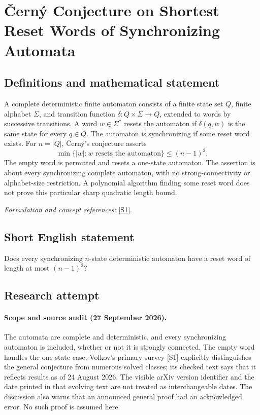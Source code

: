 \documentclass[11pt]{article}
\begin{document}
\section*{\texorpdfstring{Černý Conjecture on Shortest Reset Words of Synchronizing Automata}{Černý Conjecture on Shortest Reset Words of Synchronizing Automata}}\label{30006893}
\subsection{Definitions and mathematical statement}
A complete deterministic finite automaton consists of a finite state set $Q$, finite alphabet $\Sigma$, and transition function $\delta:Q\times\Sigma\to Q$, extended to words by successive transitions. A word $w\in\Sigma^*$ resets the automaton if $\delta(q,w)$ is the same state for every $q\in Q$. The automaton is synchronizing if some reset word exists. For $n=|Q|$, \v{C}ern\'y's conjecture asserts
\[
 \min\{|w|:w\text{ resets the automaton}\}\le(n-1)^2.
\]
The empty word is permitted and resets a one-state automaton. The assertion is about every synchronizing complete automaton, with no strong-connectivity or alphabet-size restriction. A polynomial algorithm finding some reset word does not prove this particular sharp quadratic length bound.
\par\smallskip\textit{Formulation and concept references:} \href{https://arxiv.org/html/2508.15655}{[S1]}.

\subsection{Short English statement}
Does every synchronizing $n$-state deterministic automaton have a reset word of length at most $(n-1)^2$?
\subsection{Research attempt}
\paragraph{Scope and source audit (27 September 2026).}
The automata are complete and deterministic, and every synchronizing automaton is included, whether or not it is strongly connected. The empty word handles the one-state case. Volkov's primary survey [S1] explicitly distinguishes the general conjecture from numerous solved classes; its checked text says that it reflects results as of 24 August 2026. The visible arXiv version identifier and the date printed in that evolving text are not treated as interchangeable dates. The discussion also warns that an announced general proof had an acknowledged error. No such proof is assumed here.
\end{document}
